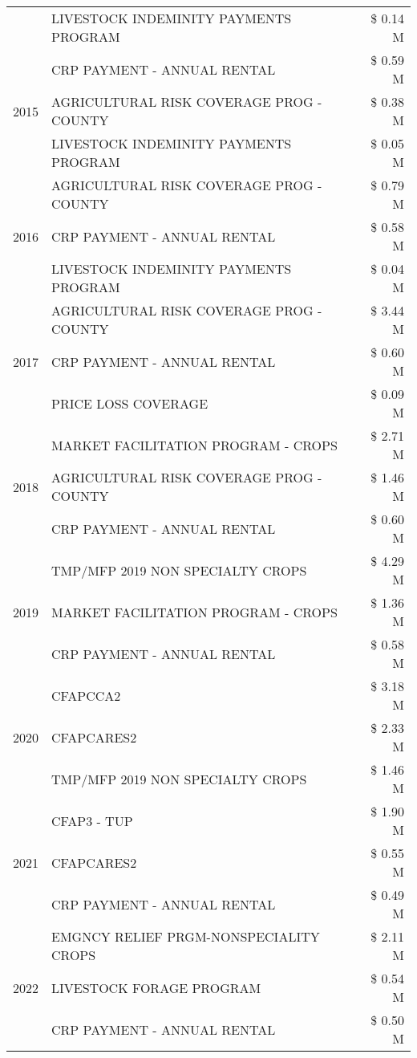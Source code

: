 \begin{tabular}{llr}
 & LIVESTOCK INDEMINITY PAYMENTS PROGRAM & \$ 0.14 M \\
\cline{1-3}
\multirow[t]{3}{*}{2015} & CRP PAYMENT - ANNUAL RENTAL & \$ 0.59 M \\
 & AGRICULTURAL RISK COVERAGE PROG - COUNTY & \$ 0.38 M \\
 & LIVESTOCK INDEMINITY PAYMENTS PROGRAM & \$ 0.05 M \\
\cline{1-3}
\multirow[t]{3}{*}{2016} & AGRICULTURAL RISK COVERAGE PROG - COUNTY & \$ 0.79 M \\
 & CRP PAYMENT - ANNUAL RENTAL & \$ 0.58 M \\
 & LIVESTOCK INDEMINITY PAYMENTS PROGRAM & \$ 0.04 M \\
\cline{1-3}
\multirow[t]{3}{*}{2017} & AGRICULTURAL RISK COVERAGE PROG - COUNTY & \$ 3.44 M \\
 & CRP PAYMENT - ANNUAL RENTAL & \$ 0.60 M \\
 & PRICE LOSS COVERAGE & \$ 0.09 M \\
\cline{1-3}
\multirow[t]{3}{*}{2018} & MARKET FACILITATION PROGRAM - CROPS & \$ 2.71 M \\
 & AGRICULTURAL RISK COVERAGE PROG - COUNTY & \$ 1.46 M \\
 & CRP PAYMENT - ANNUAL RENTAL & \$ 0.60 M \\
\cline{1-3}
\multirow[t]{3}{*}{2019} & TMP/MFP 2019 NON SPECIALTY CROPS & \$ 4.29 M \\
 & MARKET FACILITATION PROGRAM - CROPS & \$ 1.36 M \\
 & CRP PAYMENT - ANNUAL RENTAL & \$ 0.58 M \\
\cline{1-3}
\multirow[t]{3}{*}{2020} & CFAPCCA2 & \$ 3.18 M \\
 & CFAPCARES2 & \$ 2.33 M \\
 & TMP/MFP 2019 NON SPECIALTY CROPS & \$ 1.46 M \\
\cline{1-3}
\multirow[t]{3}{*}{2021} & CFAP3 - TUP & \$ 1.90 M \\
 & CFAPCARES2 & \$ 0.55 M \\
 & CRP PAYMENT - ANNUAL RENTAL & \$ 0.49 M \\
\cline{1-3}
\multirow[t]{3}{*}{2022} & EMGNCY RELIEF PRGM-NONSPECIALITY CROPS & \$ 2.11 M \\
 & LIVESTOCK FORAGE PROGRAM & \$ 0.54 M \\
 & CRP PAYMENT - ANNUAL RENTAL & \$ 0.50 M \\
\cline{1-3}
\bottomrule
\end{tabular}

